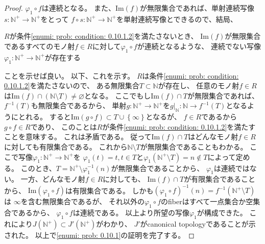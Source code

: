 \documentclass[uplatex]{jsarticle}
\theoremstyle{definition}
\renewcommand{\emptyset}{\varnothing}
\newcommand{\im}{\mathrm{Im}}
\def\N{\mathbb{N}}
\begin{document}
\begin{proof}
  \(\varphi_1\circ f\)は連続となる。
  また、\(\im(f)\)が無限集合であれば、単射連続写像\(s:\N^+\to\N^+\)をとって
  \(f\circ s: \N^+ \to \N^+\)を単射連続写像とできるので、結局、
  \begin{center}
    \(R\)が条件\ref{enumi: prob: condition: 0.10.1.2}を満たさないとき、
    \(\im(f)\)が無限集合であるすべてのモノ射\(f\in R\)に対して\(\varphi_1\circ f\)が連続となるような、
    連続でない写像\(\varphi_1:\N^+\to \N^+\)が存在する
  \end{center}
  ことを示せば良い。
  以下、これを示す。
  \(R\)は条件\ref{enumi: prob: condition: 0.10.1.2}を満たさないので、
  ある無限集合\(T\subset \N\)が存在し、
  任意のモノ射\(f\in R\)は\(\im(f) \cap (\N\setminus T) \neq \emptyset\)となる。
  ここでもし\(\im(f)\cap T\)が無限集合であれば、
  \(f^{-1}(T)\)も無限集合であるから、
  単射\(g:\N^+\to \N^+\)を\(g|_{\N}:\N\to f^{-1}(T)\)となるようにとれる。
  すると\(\im (g\circ f)\subset T\cup \left\{\infty\right\}\)となるが、
  \(f\in R\)であるから\(g\circ f\in R\)であり、
  このことは\(R\)が条件\ref{enumi: prob: condition: 0.10.1.2}を満たすことを意味する。
  これは矛盾である。
  従って\(\im(f) \cap T\)はどんなモノ射\(f\in R\)に対しても有限集合である。
  これから\(\N\setminus T\)が無限集合であることもわかる。
  ここで写像\(\varphi_1:\N^+\to \N^+\)を
  \(\varphi_1(t) = t , t\in T\)と\(\varphi_1(\N^+\setminus T) = n \not\in T\)によって定める。
  このとき、\(T = \N^+\setminus \varphi_1^{-1}(n)\)が無限集合であることから、
  \(\varphi_1\)は連続ではない。
  一方、どんなモノ射\(f\in R\)に対しても、
  \(\im(f) \cap T\)が有限集合であることから、
  \(\im(\varphi_1\circ f)\)は有限集合である。
  しかも\((\varphi_1\circ f)^{-1}(n) = f^{-1}(\N^+\setminus T)\)は
  \(\infty\)を含む無限集合であるが、
  それ以外の\(\varphi_1\circ f\)のfiberはすべて一点集合か空集合であるから、
  \(\varphi_1\circ f\)は連続である。
  以上より所望の写像\(\varphi_1\)が構成できた。
  これにより\(J(\N^+)\subset J'(\N^+)\)がわかり、
  \(J'\)がcanonical topologyであることが示された。
  以上で\ref{enumi: prob: 0.10.1}の証明を完了する。


\end{proof}
\end{document}
